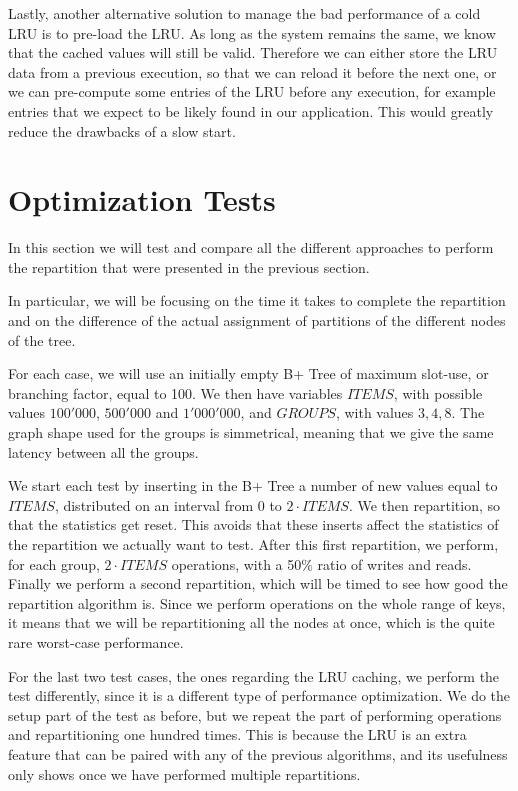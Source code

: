 Lastly, another alternative solution to manage the bad performance of a cold LRU is to pre-load the LRU. As long as the system remains the same, we know that the cached values will still be valid. Therefore we can either store the LRU data from a previous execution, so that we can reload it before the next one, or we can pre-compute some entries of the LRU before any execution, for example entries that we expect to be likely found in our application. This would greatly reduce the drawbacks of a slow start.

\section{Optimization Tests}\label{sec:optimization-tests}
In this section we will test and compare all the different approaches to perform the repartition that were presented in the previous section. 

In particular, we will be focusing on the time it takes to complete the repartition and on the difference of the actual assignment of partitions of the different nodes of the tree.

For each case, we will use an initially empty B+ Tree of maximum slot-use, or branching factor, equal to 100. We then have variables $ITEMS$, with possible values $100'000$, $500'000$ and $1'000'000$, and $GROUPS$, with values $3, 4, 8$. The graph shape used for the groups is simmetrical, meaning that we give the same latency between all the groups.

We start each test by inserting in the B+ Tree a number of new values equal to $ITEMS$, distributed on an interval from 0 to $2\cdot ITEMS$. We then repartition, so that the statistics get reset. This avoids that these inserts affect the statistics of the repartition we actually want to test. After this first repartition, we perform, for each group, $2\cdot ITEMS$ operations, with a 50\% ratio of writes and reads. Finally we perform a second repartition, which will be timed to see how good the repartition algorithm is. Since we perform operations on the whole range of keys, it means that we will be repartitioning all the nodes at once, which is the quite rare worst-case performance.

For the last two test cases, the ones regarding the LRU caching, we perform the test differently, since it is a different type of performance optimization. We do the setup part of the test as before, but we repeat the part of performing operations and repartitioning one hundred times. This is because the LRU is an extra feature that can be paired with any of the previous algorithms, and its usefulness only shows once we have performed multiple repartitions.

